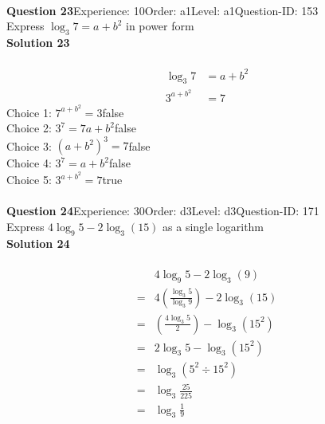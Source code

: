 \documentclass{article}
\begin{document}
\\[4pt]
\noindent\textbf{Question 23}\hspace{20pt}Experience: 10\hspace{20pt}Order: a1\hspace{20pt}Level: a1\hspace{20pt}Question-ID: 153\\[2pt]
Express $\log_{3}7=a+b^2$ in power form\\[4pt]
\noindent\textbf{Solution 23}\\[2pt]
\\[-35pt]\begin{align*}
\log_{3}7&=a+b^2\\[2pt]
3^{a+b^2}&=7
\end{align*}
Choice 1: \hspace{20pt}$7^{a+b^2}=3$\hspace{20pt}false\\
Choice 2: \hspace{20pt}$3^7=7a+b^2$\hspace{20pt}false\\
Choice 3: \hspace{20pt}$(a+b^2)^3=7$\hspace{20pt}false\\
Choice 4: \hspace{20pt}$3^{7}=a+b^2$\hspace{20pt}false\\
Choice 5: \hspace{20pt}$3^{a+b^2}=7$\hspace{20pt}true\\
\\[4pt]
\noindent\textbf{Question 24}\hspace{20pt}Experience: 30\hspace{20pt}Order: d3\hspace{20pt}Level: d3\hspace{20pt}Question-ID: 171\\[2pt]
Express $4\log_{9}5-2\log_{3}(15)$ as a single logarithm\\[4pt]
\noindent\textbf{Solution 24}\\[2pt]
\\[-35pt]\begin{align*}
&4\log_{9}5-2\log_{3}(9)\\[2pt]
=&4\left(\displaystyle\frac{\log_{3}5}{\log_{3}9}\right)-2\log_{3}(15)\\[2pt]
=&\left(\displaystyle\frac{4\log_{3}5}{2}\right)-\log_{3}(15^2)\\[2pt]
=&2\log_{3}5-\log_{3}(15^2)\\[2pt]
=&\log_{3}(5^2 \div 15^2)\\[2pt]
=&\log_{3}\displaystyle\frac{25}{225}\\[2pt]
=&\log_{3}\displaystyle\frac{1}{9}
\end{align*}
\end{document}
